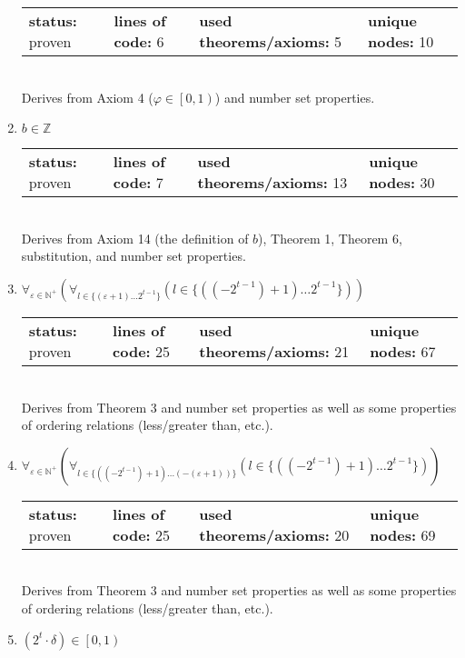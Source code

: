 \documentclass{article}[12pt]
\begin{document}
\begin{enumerate}
  \begin{tabular}{l | l | l | l}
    \textbf{status:} proven & \textbf{lines of code:} 6 & \textbf{used theorems/axioms:} 5 & \textbf{unique nodes:} 10
  \end{tabular} \hfill \\
  Derives from Axiom 4 ($\varphi \in \left[0,1\right)$) and number set properties.
\item $b \in \mathbb{Z}$ \hfill \\
  \begin{tabular}{l | l | l | l}
    \textbf{status:} proven & \textbf{lines of code:} 7 & \textbf{used theorems/axioms:} 13 & \textbf{unique nodes:} 30
  \end{tabular} \hfill \\
  Derives from Axiom 14 (the definition of $b$), Theorem 1, Theorem 6, substitution, and number set properties.
\item $\forall_{\varepsilon \in \mathbb{N}^+} \left(\forall_{l \in \{\left(\varepsilon + 1\right)\ldots 2^{t - 1}\}} \left(l \in \{\left(\left(-2^{t - 1}\right) + 1\right)\ldots 2^{t - 1}\}\right)\right)$ \hfill \\
  \begin{tabular}{l | l | l | l}
    \textbf{status:} proven & \textbf{lines of code:} 25 & \textbf{used theorems/axioms:} 21 & \textbf{unique nodes:} 67
  \end{tabular} \hfill \\
Derives from Theorem 3 and number set properties as well as some properties of ordering relations (less/greater than, etc.).
\item $\forall_{\varepsilon \in \mathbb{N}^+} \left(\forall_{l \in \{\left(\left(-2^{t - 1}\right) + 1\right)\ldots \left(-\left(\varepsilon + 1\right)\right)\}} \left(l \in \{\left(\left(-2^{t - 1}\right) + 1\right)\ldots 2^{t - 1}\}\right)\right)$ \hfill \\
  \begin{tabular}{l | l | l | l}
    \textbf{status:} proven & \textbf{lines of code:} 25 & \textbf{used theorems/axioms:} 20 & \textbf{unique nodes:} 69
  \end{tabular} \hfill \\
Derives from Theorem 3 and number set properties as well as some properties of ordering relations (less/greater than, etc.).
\item $\left(2^{t} \cdot \delta\right) \in \left[0,1\right)$ \hfill \\
  \begin{tabular}{l | l | l | l}

\end{tabular}
\end{enumerate}
\end{document}
